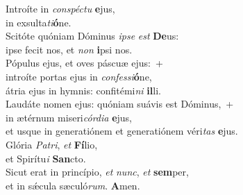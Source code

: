 \evenverse Introíte in \textit{con}\textit{spé}\textit{ctu} \textbf{e}jus,~\*\\
\evenverse in exsulta\textit{ti}\textbf{ó}ne.\\
\oddverse Scitóte quóniam Dóminus \textit{i}\textit{pse} \textit{est} \textbf{De}us:~\*\\
\oddverse ipse fecit nos, et \textit{non} \textbf{i}psi nos.\\
\evenverse Pópulus ejus, et oves páscuæ ejus:~+\\
\evenverse  introíte portas ejus in \textit{con}\textit{fes}\textit{si}\textbf{ó}ne,~\*\\
\evenverse átria ejus in hymnis: confitémi\textit{ni} \textbf{il}li.\\
\oddverse Laudáte nomen ejus: quóniam suávis est Dóminus,~+\\
\oddverse  in ætérnum miseri\textit{cór}\textit{di}\textit{a} \textbf{e}jus,~\*\\
\oddverse et usque in generatiónem et generatiónem véri\textit{tas} \textbf{e}jus.\\
\evenverse Glória \textit{Pa}\textit{tri}, \textit{et} \textbf{Fí}lio,~\*\\
\evenverse et Spirítu\textit{i} \textbf{San}cto.\\
\oddverse Sicut erat in princípio, \textit{et} \textit{nunc}, \textit{et} \textbf{sem}per,~\*\\
\oddverse et in sǽcula sæculó\textit{rum}. \textbf{A}men.\\
